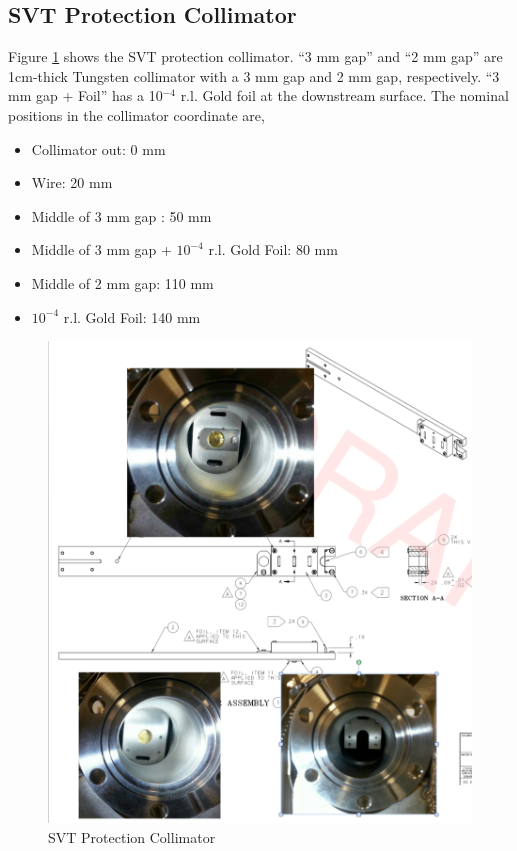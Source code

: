 \documentclass[12pt]{article}
\begin{document}
\clearpage
\subsection{SVT Protection Collimator\label{collimators}}

Figure \ref{collimator} shows the SVT protection collimator. ``3 mm gap'' and ``2 mm gap'' are 1cm-thick Tungsten collimator with a 3 mm gap and 2 mm gap, respectively. ``3 mm gap + Foil'' has a 10$^{-4}$ r.l. Gold foil at the downstream surface. The nominal positions in the collimator coordinate are,

\begin{itemize}
\item
Collimator out:  0 mm
\item
Wire: 20 mm
\item
Middle of 3 mm gap : 50 mm
\item
Middle of 3 mm gap + $10^{-4}$ r.l. Gold Foil: 80 mm
\item
Middle of 2 mm gap: 110 mm
\item
$10^{-4}$ r.l. Gold Foil: 140 mm
\end{itemize}

\begin{figure}[ht!]
\centering
\includegraphics[width=15cm]{svt_collimator.pdf}
\caption{SVT Protection Collimator}
\label{collimator}
\end{figure}
\end{document}
